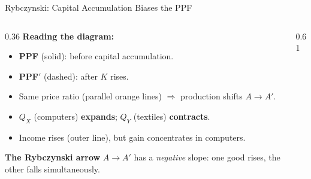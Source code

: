 \documentclass[aspectratio=169]{beamer}
\begin{document}
\begin{frame}[shrink=5]{Rybczynski: Capital Accumulation Biases the PPF}
\begin{columns}[T]
\begin{column}{0.36\textwidth}
\textbf{Reading the diagram:}
\begin{itemize}\small
  \item \textcolor{UNBCDark}{\textbf{PPF}} (solid):
        before capital accumulation.
  \item \textcolor{AccentTeal}{\textbf{PPF$'$}}
        (dashed): after $K$ rises.
  \item Same price ratio (parallel orange lines)
        $\Rightarrow$ production shifts $A \to A'$.
  \item $Q_X$ (computers) \textbf{expands};
        $Q_Y$ (textiles) \textbf{contracts}.
  \item Income rises (outer line), but gain
        concentrates in computers.
\end{itemize}
\vspace{0.4em}
\small\textbf{The \textcolor{AccentRed}{Rybczynski arrow}}
$A \to A'$ has a \emph{negative} slope:
one good rises, the other falls simultaneously.
\end{column}
\begin{column}{0.61\textwidth}
\end{column}
\end{columns}
\end{frame}
\end{document}
